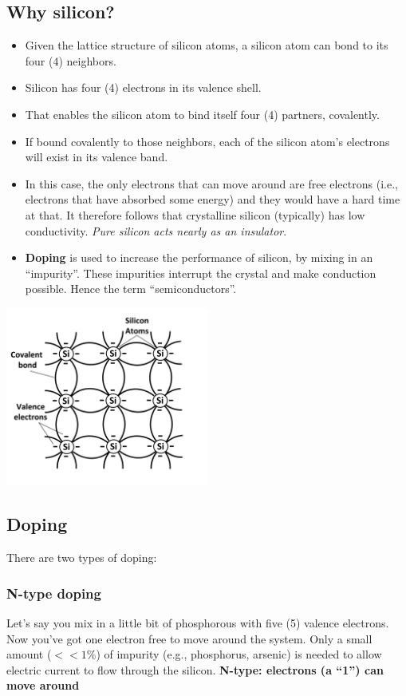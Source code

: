 \documentclass[11pt]{book}
\begin{document}
\subsection{Why silicon?}
\begin{itemize}
	\item Given the lattice structure of silicon atoms, a silicon atom can bond to its four (4) neighbors.
	\item Silicon has four (4) electrons in its valence shell.
	\item That enables the silicon atom to bind itself four (4) partners, covalently.  
	\item If bound covalently to those neighbors, each of the silicon atom's electrons will exist in its valence band.
	\item In this case, the only electrons that can move around are free electrons (i.e., electrons that have absorbed some energy) and they would have a hard time at that. It therefore follows that crystalline silicon (typically) has low conductivity. \textit{Pure silicon acts nearly as an insulator}.
	\item \textbf{Doping} is used to increase the performance of silicon, by mixing in an ``impurity''. These impurities interrupt the crystal and make conduction possible. Hence the term ``semiconductors''.
\end{itemize}

\begin{center}
	\includegraphics[width=0.5\textwidth]{figures/19.01.png}
\end{center}


\subsection{Doping}
There are two types of doping:

\subsubsection{N-type doping}
Let’s say you mix in a little bit of phosphorous with five (5) valence electrons. Now you’ve got one electron free to move around the system. Only a small amount ($<<1$\%) of impurity (e.g., phosphorus, arsenic) is needed to allow electric current to flow through the silicon. \textbf{N-type: electrons (a ``1'') can move around}
\end{document}
